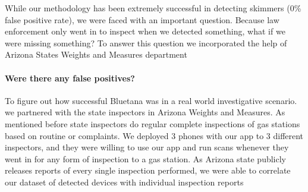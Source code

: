 While our methodology has been extremely successful in detecting skimmers (0\% false positive rate), we were faced with an important question. Because law enforcement only went in to inspect when we detected something, what if we were missing something? To answer this question we incorporated the help of Arizona States Weights and Measures department

\paragraph {Were there any false positives?}

To figure out how successful Bluetana was in a real world investigative scenario. we partnered with the state inspectors in Arizona Weights and Measures. As mentioned before state inspectors do regular complete inspections of gas stations based on routine or complaints. We deployed 3 phones with our app to 3 different inspectors, and they were willing to use our app and run scans whenever they went in for any form of inspection to a gas station. As Arizona state publicly releases reports of every single inspection performed, we were able to correlate our dataset of detected devices with individual inspection reports


\begin{table}
\centering
\scriptsize
{}
\caption{Distribution of inspections done by inspector(I$_n$). Table indicates low false positive and negative rates}
\label{tab:arizona_falsepositive}
\end{table}


